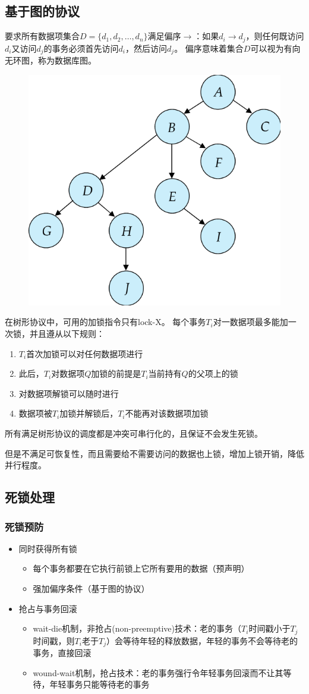 \subsection{基于图的协议}
要求所有数据项集合$D=\{d_1,d_2,\ldots,d_n\}$满足偏序$\to$：如果$d_i\to d_j$，则任何既访问$d_i$又访问$d_j$的事务必须首先访问$d_i$，然后访问$d_j$。
偏序意味着集合$D$可以视为有向无环图，称为数据库图。
\begin{figure}[H]
\centering
\includegraphics[width=0.4\linewidth]{fig/tree_protocol.png}
\end{figure}

在树形协议中，可用的加锁指令只有lock-X。
每个事务$T_i$对一数据项最多能加一次锁，并且遵从以下规则：
\begin{enumerate}
	\item $T_i$首次加锁可以对任何数据项进行
	\item 此后，$T_i$对数据项$Q$加锁的前提是$T_i$当前持有$Q$的父项上的锁
	\item 对数据项解锁可以随时进行
	\item 数据项被$T_i$加锁并解锁后，$T_i$不能再对该数据项加锁
\end{enumerate}
所有满足树形协议的调度都是冲突可串行化的，且保证不会发生死锁。

但是不满足可恢复性，而且需要给不需要访问的数据也上锁，增加上锁开销，降低并行程度。

\subsection{死锁处理}
\subsubsection{死锁预防}
\begin{itemize}
\item 同时获得所有锁
\begin{itemize}
	\item 每个事务都要在它执行前锁上它所有要用的数据（预声明）
	\item 强加偏序条件（基于图的协议）
\end{itemize}

\item 抢占与事务回滚
\begin{itemize}
	\item wait-die机制，非抢占(non-preemptive)技术：老的事务（$T_i$时间戳小于$T_j$时间戳，则$T_i$老于$T_j$）会等待年轻的释放数据，年轻的事务不会等待老的事务，直接回滚
	\item wound-wait机制，抢占技术：老的事务强行令年轻事务回滚而不让其等待，年轻事务只能等待老的事务
\end{itemize}
\end{itemize}

